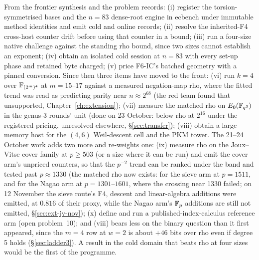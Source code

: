 From the frontier synthesis and the problem records: (i) register the
torsion-symmetrised bases and the $n=83$ dense-root engine in ecbench under
immutable method identities and emit cold and online records; (ii) resolve
the inherited-F4 cross-host counter drift before using that counter in a
bound; (iii) run a four-size native challenge against the standing rho
bound, since two sizes cannot establish an exponent; (iv) obtain an isolated
cold session at $n=83$ with every set-up phase and retained byte charged;
(v) price F6-IC's batched geometry with a pinned conversion. Since then
three items have moved to the front: (vi) run $k=4$ over
$\mathbb{F}_{(2^m)^4}$ at $m=15$--$17$ against a measured negation-map rho, where
the fitted trend was read as predicting parity near $n\approx2^{68}$ (the
red team found that unsupported, Chapter~\ref{ch:extension}); (vii) measure the
matched rho on $E_0(\mathbb{F}_{q^3})$ in the genus-3 rounds' unit (done on 23
October: below rho at $2^{16}$ under the registered pricing, unresolved
elsewhere, \S\ref{sec:transfer}); (viii) obtain a
large-memory host for the $(4,6)$ Weil-descent cell and the PKM tower.
The 21--24 October work adds two more and re-weights one: (ix) measure rho
on the Joux--Vitse cover family at $p\ge503$ (or a size where it can be run)
and emit the cover arm's unpriced counters, so that the $p^{-2}$ trend can be
ranked under the band and tested past $p\approx1330$ (the matched rho now
exists: for the sieve arm at $p=1511$, and for the Nagao arm at
$p=1301$--$1601$, where the crossing near 1330 failed; on 12 November the
sieve route's F4, descent and linear-algebra additions were emitted, at
$0.816$ of their proxy, while the Nagao arm's $\mathbb{F}_p$ additions are still
not emitted, \S\ref{sec:ext-jv-nov}); (x) define and run a
published-index-calculus reference arm (open problem~10); and (viii) bears
less on the binary question than it first appeared, since the $m=4$ row at $w=2$ is
about $+46$ bits over rho even if degree 5 holds (\S\ref{sec:ladder3}).
A result in the cold domain that beats rho at four sizes would be the first
 of the programme.
